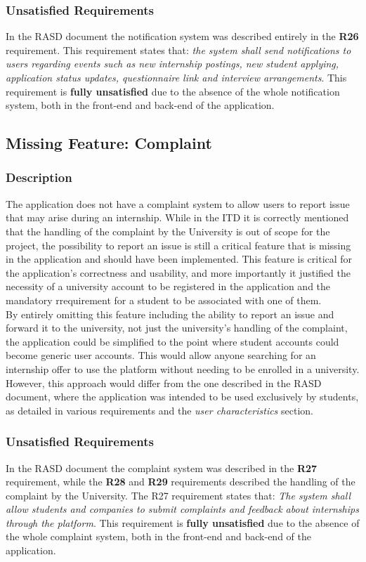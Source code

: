 \subsubsection{Unsatisfied Requirements}
In the RASD document the notification system was described entirely in the \textbf{R26} requirement. This requirement states that: \textit{the system shall send notifications to users regarding events such as new internship postings, new student applying, application status updates, questionnaire link and interview arrangements}. This requirement is \textbf{fully unsatisfied} due to the absence of the whole notification system, both in the front-end and back-end of the application.
\subsection{Missing Feature:  Complaint}
\subsubsection{Description}
The application does not have a complaint system to allow users to report issue that may arise during an internship. While in the ITD it is correctly mentioned that the handling of the complaint by the University is out of scope for the project, the possibility to report an issue is still a critical feature that is missing in the application and should have been implemented. This feature is critical for the application's correctness and usability, and more importantly it justified the necessity of a university account to be registered in the application and the mandatory rrequirement for a student to be associated with one of them. \\
By entirely omitting this feature including the ability to report an issue and forward it to the university, not just the university's handling of the complaint, the application could be simplified to the point where student accounts could become generic user accounts. This would allow anyone searching for an internship offer to use the platform without needing to be enrolled in a university. However, this approach would differ from the one described in the RASD document, where the application was intended to be used exclusively by students, as detailed in various requirements and the \textit{user characteristics} section.\\
\subsubsection{Unsatisfied Requirements}
In the RASD document the complaint system was described in the \textbf{R27} requirement, while the \textbf{R28} and \textbf{R29} requirements described the handling of the complaint by the University. The R27 requirement states that: \textit{The system shall allow students and companies to submit complaints and feedback about internships through the platform}. This requirement is \textbf{fully unsatisfied} due to the absence of the whole complaint system, both in the front-end and back-end of the application.


